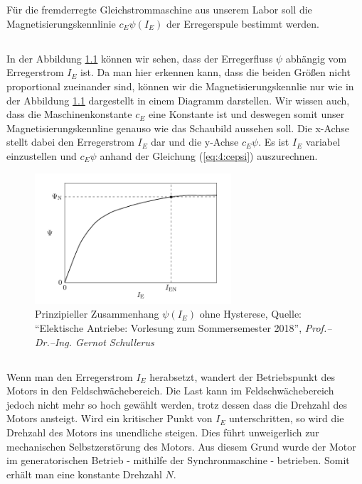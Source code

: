 \chapter{}
Für die fremderregte Gleichstrommaschine aus unserem Labor soll die Magnetisierungskennlinie $ c_{E}\psi(I_{E}) $ der Erregerspule bestimmt werden.
\section{}
In der Abbildung \ref{fig:5:skript} können wir sehen, dass der Erregerfluss $ \psi $ abhängig vom Erregerstrom $ I_{E} $ ist. Da man hier erkennen kann, dass die beiden Größen nicht proportional zueinander sind, können wir die Magnetisierungskennlie nur wie in der Abbildung \ref{fig:5:skript} dargestellt in einem Diagramm darstellen. Wir wissen auch, dass die Maschinenkonstante $ c_{E} $ eine Konstante ist und deswegen somit unser Magnetisierungskennline genauso wie das Schaubild aussehen soll. Die x-Achse stellt dabei den Erregerstrom $ I_{E} $ dar und die y-Achse $ c_{E}\psi $. Es ist $ I_{E} $ variabel einzustellen und $ c_{E}\psi $ anhand der Gleichung (\ref{eq:4:cepsi}) auszurechnen.

\begin{figure}[h]
	\centering
	\includegraphics[width=0.65\textwidth]{./bilder/aufgabe5_skript.pdf}
	\caption{Prinzipieller Zusammenhang $ \psi(I_{E}) $ ohne Hysterese, Quelle: \textquotedblleft Elektische Antriebe: Vorlesung zum Sommersemester 2018\textquotedblright, \textit{Prof.–Dr.–Ing. Gernot Schullerus}}
	\label{fig:5:skript}
\end{figure}


\section{}
Wenn man den Erregerstrom $ I_{E} $ herabsetzt, wandert der Betriebspunkt des Motors in den Feldschwächebereich. Die Last kann im Feldschwächebereich jedoch nicht mehr so hoch gewählt werden, trotz dessen dass die Drehzahl des Motors ansteigt. Wird ein kritischer Punkt von $ I_{E} $ unterschritten, so wird die Drehzahl des Motors ins unendliche steigen. Dies führt unweigerlich zur mechanischen Selbstzerstörung des Motors. Aus diesem Grund wurde der Motor im generatorischen Betrieb - mithilfe der Synchronmaschine - betrieben. Somit erhält man eine konstante Drehzahl $ N $.


